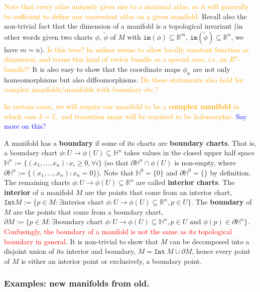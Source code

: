\documentclass[a4paper]{article}
\theoremstyle{definition} \newtheorem*{definition}{Definition}
\theoremstyle{definition} \newtheorem*{definitions}{Definitions}
\theoremstyle{plain} \newtheorem{theorem}{Theorem}[section]
\theoremstyle{plain} \newtheorem{proposition}[theorem]{Proposition}
\theoremstyle{plain} \newtheorem{corollary}[theorem]{Corollary}
\theoremstyle{plain} \newtheorem{lemma}[theorem]{Lemma}
\theoremstyle{plain} \newtheorem{example}[theorem]{Example}
\newcommand{\checkCorrect}[1]{\textcolor{red}{#1}}
\newcommand{\understandBetter}[1]{\textcolor{orange}{#1}}
\newcommand{\question}[1]{\textcolor{orange}{#1}}
\newcommand{\explainFurther}[1]{\textcolor{blue}{#1}}
\newcommand{\defn}[1]{\textbf{#1}}
\newcommand{\realnos}{\mathbb{R}}
\newcommand{\complexnos}{\mathbb{C}}
\begin{document}
\understandBetter{Note that every atlas uniquely gives rise to a maximal atlas, so it will generally be sufficient to define any convenient atlas on a given manifold.} Recall also the non-trivial fact that the dimension of a manifold is a topological invariant (in other words given two charts $\phi$, $\tilde{\phi}$ of $M$ with $\mathtt{im}(\phi)\subseteq \realnos^m$, $\mathtt{im}(\tilde{\phi})\subseteq \realnos^n$, we have $m=n$). \question{Is this true? In milnor seems to allow locally constant function as dimension, and terms this kind of vector bundle as a special case, i.e. an $R^n$-bundle!?} It is also easy to show that the coordinate maps $\phi_\alpha$ are not only homeomorphisms but also diffeomorphisms. \question{Do these statements also hold for complex manifolds/manifolds with boundary etc.?}

\understandBetter{In certain cases, we will require our manifold to be a \defn{complex manifold} in which case $k=\complexnos$, and transition maps will be required to be \understandBetter{holomorphic}.}
\explainFurther{Say more on this?}

A manifold has a \defn{boundary} if some of its charts are \defn{boundary charts}. That is, a boundary chart $\phi:U\to \phi(U)\subseteq \mathbb{H}^n$ takes values in the closed upper half space $\mathbb{H}^n := \{(x_1, \ldots, x_n): x_i\geq 0, \forall i\}$ (so that $\partial \mathbb{H}^n \cap \phi(U)$ is non-empty, where $\partial \mathbb{H}^n := \{(x_1, \ldots, x_n): x_n=0\}$). Note that $\mathbb{H}^0 = \{0\}$ and $\partial \mathbb{H}^0 = \{\}$ by definition. The remaining charts $\phi:U\to \phi(U)\subseteq \realnos^n$ are called \defn{interior charts}. The \defn{interior} of a manifold $M$ are the points that come from an interior chart, $\texttt{Int} M := \{p\in M: \exists \textrm{interior chart } \phi:U\to \phi(U)\subseteq \realnos^n, p\in U \}$. The \defn{boundary} of $M$ are the points that come from a boundary chart, $\partial M:=\{p\in M: \exists \textrm{boundary chart } \phi:U\to \phi(U)\subseteq \mathbb{H}^n, p\in U \textrm{ and } \phi(p)\in \partial \mathbb{H}^n \}$. \checkCorrect{Confusingly, the boundary of a manifold is not the same as its topological boundary in general}. It is non-trivial to show that $M$ can be decomposed into a disjoint union of its interior and boundary, $M = \mathtt{Int} \ M \mathbin{\dot{\cup}} \partial M$, hence every point of $M$ is either an interior point or exclusively, a boundary point.

\subsubsection{Examples: new manifolds from old.}
\end{document}
